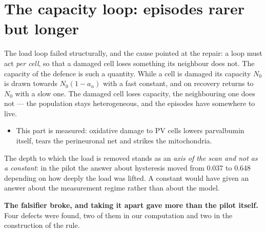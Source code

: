 \section{The capacity loop: episodes rarer but longer}\label{sec:cap}
The load loop failed structurally, and the cause pointed at the repair: a loop must act \emph{per cell}, so that a damaged cell loses something its neighbour does not. The capacity of the defence is such a quantity. While a cell is damaged its capacity $N_0$ is drawn towards $N_0(1-a_n)$ with a fast constant, and on recovery returns to $N_0$ with a slow one. The damaged cell loses capacity, the neighbouring one does not --- the population stays heterogeneous, and the episodes have somewhere to live.

\facts
\begin{itemize}
\item This part is measured: oxidative damage to PV cells lowers parvalbumin itself, tears the perineuronal net and strikes the mitochondria.\tS
\end{itemize}

The depth to which the load is removed stands as an \emph{axis of the scan and not as a constant}: in the pilot the answer about hysteresis moved from 0.037 to 0.648 depending on how deeply the load was lifted. A constant would have given an answer about the measurement regime rather than about the model.

\textbf{The falsifier broke, and taking it apart gave more than the pilot itself.} Four defects were found, two of them in our computation and two in the construction of the rule.

